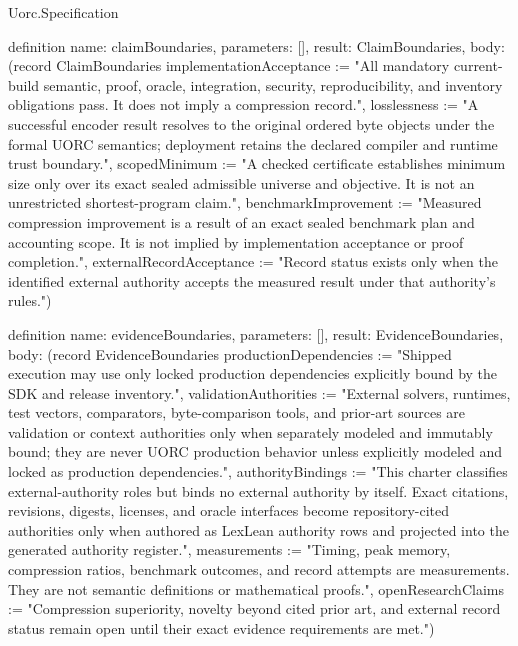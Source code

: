 \begin{lexlean}{Uorc.Specification}
\begin{semanticmodule}
definition{
  name: claimBoundaries,
  parameters: [],
  result: ClaimBoundaries,
  body: (record ClaimBoundaries {implementationAcceptance := "All mandatory current-build semantic, proof, oracle, integration, security, reproducibility, and inventory obligations pass. It does not imply a compression record.", losslessness := "A successful encoder result resolves to the original ordered byte objects under the formal UORC semantics; deployment retains the declared compiler and runtime trust boundary.", scopedMinimum := "A checked certificate establishes minimum size only over its exact sealed admissible universe and objective. It is not an unrestricted shortest-program claim.", benchmarkImprovement := "Measured compression improvement is a result of an exact sealed benchmark plan and accounting scope. It is not implied by implementation acceptance or proof completion.", externalRecordAcceptance := "Record status exists only when the identified external authority accepts the measured result under that authority's rules."})
}

definition{
  name: evidenceBoundaries,
  parameters: [],
  result: EvidenceBoundaries,
  body: (record EvidenceBoundaries {productionDependencies := "Shipped execution may use only locked production dependencies explicitly bound by the SDK and release inventory.", validationAuthorities := "External solvers, runtimes, test vectors, comparators, byte-comparison tools, and prior-art sources are validation or context authorities only when separately modeled and immutably bound; they are never UORC production behavior unless explicitly modeled and locked as production dependencies.", authorityBindings := "This charter classifies external-authority roles but binds no external authority by itself. Exact citations, revisions, digests, licenses, and oracle interfaces become repository-cited authorities only when authored as LexLean authority rows and projected into the generated authority register.", measurements := "Timing, peak memory, compression ratios, benchmark outcomes, and record attempts are measurements. They are not semantic definitions or mathematical proofs.", openResearchClaims := "Compression superiority, novelty beyond cited prior art, and external record status remain open until their exact evidence requirements are met."})
}


\end{semanticmodule}
\end{lexlean}
